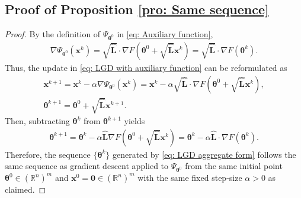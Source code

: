 \documentclass{siamart251216}
\begin{document}
\subsection{Proof of Proposition \ref{pro: Same sequence}}
\begin{proof}
    By the definition of $\Psi_{\boldsymbol{\theta}^{0}}$ in \eqref{eq: Auxiliary function},
    \begin{gather}
    \label{eq: Psi gradient}
       \nabla \Psi_{\boldsymbol{\theta}^{0}}(\mathbf{x}^{k}) = \sqrt{\hat{\mathbf{L}}} \cdot \nabla F(\boldsymbol{\theta}^{0} + \sqrt{\hat{\mathbf{L}}} \mathbf{x}^{k}) = \sqrt{\hat{\mathbf{L}}} \cdot \nabla F(\boldsymbol{\theta}^{k}).
    \end{gather}
    Thus, the update in \eqref{eq: LGD with auxiliary function} can be reformulated as
    \begin{gather*}
        \mathbf{x}^{k+1} = \mathbf{x}^{k} - \alpha \nabla \Psi_{\boldsymbol{\theta}^{0}}(\mathbf{x}^{k}) = \mathbf{x}^{k} - \alpha \sqrt{\hat{\mathbf{L}}} \cdot \nabla F(\boldsymbol{\theta}^{0} + \sqrt{\hat{\mathbf{L}}} \mathbf{x}^{k}),\\
        \boldsymbol{\theta}^{k+1} = \boldsymbol{\theta}^{0} + \sqrt{\hat{\mathbf{L}}} \mathbf{x}^{k+1}.
    \end{gather*}
    Then, subtracting $\boldsymbol{\theta}^{k}$ from $\boldsymbol{\theta}^{k+1}$ yields
    \begin{gather*}
        \boldsymbol{\theta}^{k+1} = \boldsymbol{\theta}^{k} - \alpha \hat{\mathbf{L}} \nabla F(\boldsymbol{\theta}^{0} + \sqrt{\hat{\mathbf{L}}}\mathbf{x}^{k}) = \boldsymbol{\theta}^{k} - \alpha \hat{\mathbf{L}} \cdot \nabla  F(\boldsymbol{\theta}^{k}).
    \end{gather*}
    Therefore, the sequence $\{\boldsymbol{\theta}^{k}\}$ generated by \eqref{eq: LGD aggregate form} follows the same sequence as gradient descent applied to $\Psi_{\boldsymbol{\theta}^{0}}$ from the same initial point $\boldsymbol{\theta}^{0} \in (\mathbb{R}^{n})^{m}$ and $\mathbf{x}^{0} = \bm{0} \in (\mathbb{R}^{n})^{m}$ with the same fixed step-size $\alpha > 0$ as claimed.
\end{proof}
\end{document}

